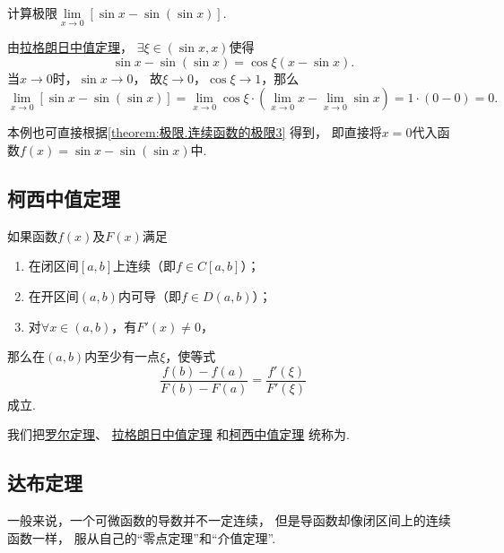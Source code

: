 \begin{example}
\def\l{\lim\limits_{x\to0}}%
计算极限\(\l \left[\sin x - \sin(\sin x)\right]\).
\begin{solution}
由\hyperref[theorem:微分中值定理.拉格朗日中值定理]{拉格朗日中值定理}，
\(\exists\xi\in(\sin x,x)\)使得\[
	\sin x - \sin(\sin x)
	= \cos\xi (x-\sin x).
\]
当\(x\to0\)时，\(\sin x\to0\)，
故\(\xi\to0\)，\(\cos\xi\to1\)，那么\[
	\l \left[\sin x - \sin(\sin x)\right]
	= \l \cos\xi \cdot \left(\l x - \l \sin x\right)
	= 1 \cdot (0-0) = 0.
\]
\end{solution}
\end{example}
本例也可直接根据\cref{theorem:极限.连续函数的极限3} 得到，
即直接将\(x=0\)代入函数\(f(x) = \sin x - \sin(\sin x)\)中.

\subsection{柯西中值定理}
\begin{theorem}[柯西中值定理]\label{theorem:微分中值定理.柯西中值定理}
如果函数\(f(x)\)及\(F(x)\)满足
\begin{enumerate}
	\item 在闭区间\([a,b]\)上连续（即\(f \in C[a,b]\)）；
	\item 在开区间\((a,b)\)内可导（即\(f \in D(a,b)\)）；
	\item 对\(\forall x\in(a,b)\)，有\(F'(x) \neq 0\)，
\end{enumerate}
那么在\((a,b)\)内至少有一点\(\xi\)，使等式
\begin{equation}
\frac{f(b)-f(a)}{F(b)-F(a)}=\frac{f'(\xi)}{F'(\xi)}
\end{equation}
成立.
\end{theorem}

我们把\hyperref[theorem:微分中值定理.罗尔定理]{罗尔定理}、
\hyperref[theorem:微分中值定理.拉格朗日中值定理]{拉格朗日中值定理}%
和\hyperref[theorem:微分中值定理.柯西中值定理]{柯西中值定理}%
统称为.

\subsection{达布定理}
一般来说，一个可微函数的导数并不一定连续，
但是导函数却像闭区间上的连续函数一样，
服从自己的“零点定理”和“介值定理”.

